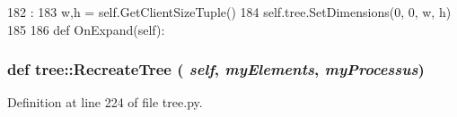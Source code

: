 \begin{DoxyCode}
182                            :
183         w,h = self.GetClientSizeTuple()
184         self.tree.SetDimensions(0, 0, w, h)
185 
186 
    def OnExpand(self):
\end{DoxyCode}
\hypertarget{namespacetree_a9d5b276fff7823cd7aa5a31d8af15f58}{
\subsubsection[{RecreateTree}]{\setlength{\rightskip}{0pt plus 5cm}def tree::RecreateTree ( {\em self}, \/   {\em myElements}, \/   {\em myProcessus})}}
\label{namespacetree_a9d5b276fff7823cd7aa5a31d8af15f58}


Definition at line 224 of file tree.py.


